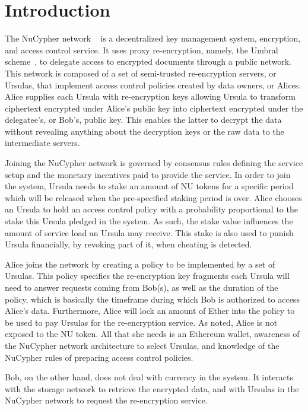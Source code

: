 \section{Introduction}
\label{intro}
The NuCypher network ~\cite{egorov2017nucypher} is a decentralized key management 
system, encryption, and access control service. It uses proxy re-encryption, namely, the 
Umbral  scheme~\cite{umbral2018}, to delegate access to encrypted 
documents through a public network. This network is composed of a set of semi-trusted 
re-encryption servers, or Ursulas, that implement access control policies created by data 
owners, or Alices. Alice supplies each Ursula with re-encryption keys allowing Ursula to transform 
ciphertext encrypted under Alice's public key into ciphertext encrypted under the delegatee's, or Bob's,
public key. This enables the latter to decrypt the data without revealing anything about the
decryption keys or the raw data to the intermediate servers.


Joining the NuCypher network is governed by consensus rules defining the service setup
and the monetary incentives paid to provide the service. In order to join the 
system, Ursula needs to stake an amount of NU tokens for a specific period
which will be released when the pre-specified staking period is over. Alice chooses an
Ursula to hold an access control policy with a probability proportional to the stake this Ursula 
pledged in the system. As such, the stake value influences the amount of service load an Ursula
may receive. This stake is also used to punish Ursula financially, by revoking part 
of it, when cheating is detected. 


Alice joins the network by creating a policy to be implemented by a 
set of Ursulas. This policy specifies the re-encryption key fragments each Ursula will
need to answer requests coming from Bob(s), as well as the duration of the policy, which 
is basically the timeframe during which Bob is authorized to access Alice's data.  Furthermore,
Alice will lock an amount of Ether into the policy to be used to pay Ursulas for the re-encryption 
service. As noted, Alice is not exposed to the NU token. All that she needs is an Ethereum
wallet, awareness of the NuCypher network architecture to select Ursulas, and knowledge of the
NuCypher rules of preparing access control policies.


Bob, on the other hand, does not deal with currency in the system. It interacts with the storage 
network to retrieve the encrypted data, and with Ursulas in the NuCypher network to request the
re-encryption service.


